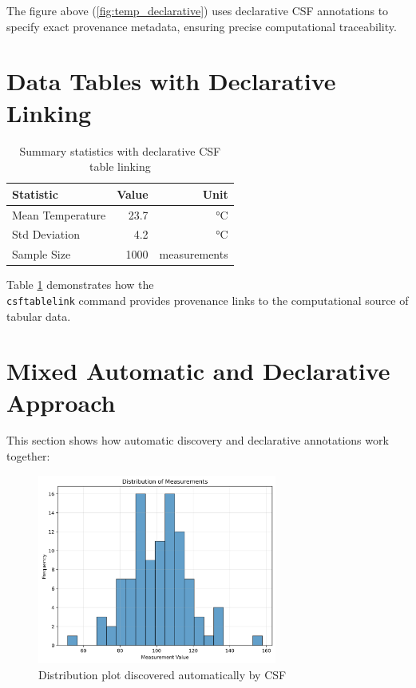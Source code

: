 \documentclass{article}
\begin{document}
The figure above (\ref{fig:temp_declarative}) uses declarative CSF annotations to specify 
exact provenance metadata, ensuring precise computational traceability.

\section{Data Tables with Declarative Linking}

\begin{table}[h]
\centering
\begin{tabular}{|l|r|r|}
\hline
Statistic & Value & Unit \\
\hline
Mean Temperature & 23.7 & °C \\
Std Deviation & 4.2 & °C \\
Sample Size & 1000 & measurements \\
\hline
\end{tabular}
\caption{Summary statistics with declarative CSF table linking}
\label{tab:summary_declarative}
\end{table}

Table \ref{tab:summary_declarative} demonstrates how the \texttt{\\csftablelink} command 
provides provenance links to the computational source of tabular data.

\section{Mixed Automatic and Declarative Approach}

This section shows how automatic discovery and declarative annotations work together:

\begin{figure}[h]
\centering
\includegraphics[width=0.7\textwidth]{figures/measurement_distribution.png}
\caption{Distribution plot discovered automatically by CSF}
\label{fig:auto}
\end{figure}
\end{document}
